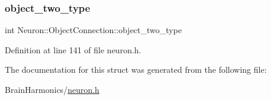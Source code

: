 \subsubsection{\texorpdfstring{object\+\_\+two\+\_\+type}{object\_two\_type}}
{\footnotesize\ttfamily int Neuron\+::\+Object\+Connection\+::object\+\_\+two\+\_\+type}



Definition at line 141 of file neuron.\+h.



The documentation for this struct was generated from the following file\+:\begin{DoxyCompactItemize}
\item 
Brain\+Harmonics/\mbox{\hyperlink{neuron_8h}{neuron.\+h}}\end{DoxyCompactItemize}
